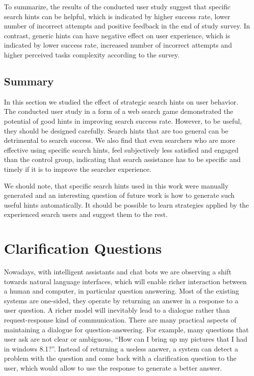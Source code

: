 To summarize, the results of the conducted user study suggest that specific search hints can be helpful, which is indicated by higher success rate, lower number of incorrect attempts and positive feedback in the end of study survey.
In contrast, generic hints can have negative effect on user experience, which is indicated by lower success rate, increased number of incorrect attempts and higher perceived tasks complexity according to the survey.

\subsection{Summary}
In this section we studied the effect of strategic search hints on user behavior. 
The conducted user study in a form of a web search game demonstrated the potential of good hints in improving search success rate.
However, to be useful, they should be designed carefully.
Search hints that are too general can be detrimental to search success.
We also find that even searchers who are more effective using specific search hints, feel subjectively less satisfied and engaged than the control group, indicating that search assistance has to be specific and timely if it is to improve the searcher experience.

We should note, that specific search hints used in this work were manually generated and an interesting question of future work is how to generate such useful hints automatically.
It should be possible to learn strategies applied by the experienced search users and suggest them to the rest.

\section{Clarification Questions}
\label{sec:user:clarification}

Nowadays, with intelligent assistants and chat bots we are observing a shift towards natural language interfaces, which will enable richer interaction between a human and computer, in particular question answering.
Most of the existing systems are one-sided, \ie they operate by returning an answer in a response to a user question.
A richer model will inevitably lead to a dialogue rather than request-response kind of communication.
There are many practical aspects of maintaining a dialogue for question-answering.
For example, many questions that user ask are not clear or ambiguous, \eg ``How can I bring up my pictures that I had in windows 8.1?''.
Instead of returning a useless answer, a system can detect a problem with the question and come back with a clarification question to the user, which would allow to use the response to generate a better answer.

